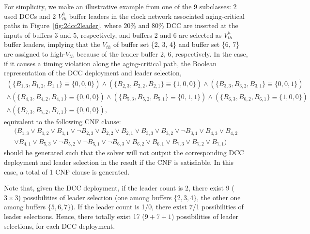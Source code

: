 For simplicity, we make an illustrative example from one of the 9 subclasses: 2 used DCCs and 2 $V_{th}^h$ buffer leaders in the clock network associated aging-critical paths in Figure~\ref{fig:2dcc2leader}, where 20\% and 80\% DCC are inserted at the inputs of buffers 3 and 5, respectively, and buffers 2 and 6 are selected as $V_{th}^h$ buffer leaders, implying that the $V_{th}$ of buffer set \{2, 3, 4\} and buffer set \{6, 7\} are assigned to high-$V_{th}$ because of the leader buffer 2, 6, respectively. In the case, if it causes a timing violation along the aging-critical path, the Boolean representation of the DCC deployment and leader selection,
{\fontsize{9}{10}
\begin{gather*}
\left(\{B_{1,3}, B_{1,2}, B_{1,1}\} \equiv \{0, 0, 0\} \right) \land \left( \{B_{2,3}, B_{2,2}, B_{2,1}\} \equiv \{1, 0, 0\} \right) \land \left(\{B_{3,3}, B_{3,2}, B_{3,1}\} \equiv \{0, 0, 1\} \right) \\ 
\land \left( \{B_{4,3}, B_{4,2}, B_{4,1}\} \equiv \{0, 0, 0\} \right) \land \left(\{B_{5,3}, B_{5,2}, B_{5,1}\} \equiv \{0, 1, 1\} \right) \land \left( \{B_{6,3}, B_{6,2}, B_{6,1}\} \equiv \{1, 0, 0\} \right)\\
\land \left( \{B_{7,3}, B_{7,2}, B_{7,1}\} \equiv \{0, 0, 0\} \right),
\end{gather*}}equivalent to the following CNF clause:
{\fontsize{9}{10}
\begin{gather*}
(B_{1,3} \lor B_{1,2} \lor B_{1,1} \lor \neg B_{2,3} \lor B_{2,2} \lor B_{2,1}  \lor B_{3,3} \lor B_{3,2} \lor \neg B_{3,1} \lor B_{4,3} \lor B_{4,2} \\
\lor B_{4,1} \lor B_{5,3} \lor \neg B_{5,2} \lor \neg B_{5,1} \lor \neg  B_{6,3} \lor B_{6,2} \lor B_{6,1} \lor B_{7,3} \lor B_{7,2} \lor B_{7,1} )
\end{gather*}}should be generated such that the solver will not output the corresponding DCC deployment and leader selection in the result if the CNF is satisfiable. In this case, a total of 1 CNF clause is generated.

Note that, given the DCC deployment, if the leader count is 2, there exist 9 ($3 \times 3$) possibilities of leader selection (one among buffers $\{2, 3, 4\}$, the other one among buffers $\{5, 6, 7\}$).
If the leader count is 1/0, there exist 7/1 possibilities of leader selections. Hence, there totally exist 17 ($9+7+1$) possibilities of leader selections, for each DCC deployment.



